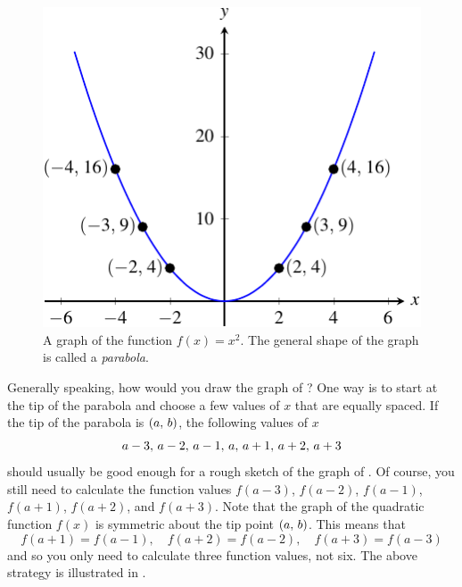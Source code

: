 \documentclass[a4paper,oneside,12pt]{article}
\begin{document}
\begin{figure}[!htbp]
\centering
\includegraphics[scale=1.2]{image/07/a-1.pdf}
\caption{%
  A graph of the function $f(x) = x^2$.  The general shape of the
  graph is called a \emph{parabola}.
}
\label{fig:quadratic_a_1}
\end{figure}

Generally speaking, how would you draw the graph of
?  One way is to start at the
tip of the parabola and choose a few values of $x$ that are equally
spaced.  If the tip of the parabola is $\left\lparen{a},\, {b}\right\rparen$, the following
values of $x$
\[
{a-3},\, {a-2},\, {a-1},\, {a},\, {a+1},\, {a+2},\, {a+3}
\]
should usually be good enough for a rough sketch of the graph of
.  Of course, you still need
to calculate the function values $f(a-3)$, $f(a-2)$, $f(a-1)$,
$f(a+1)$, $f(a+2)$, and $f(a+3)$.  Note that the graph of the
quadratic function $f(x)$ is symmetric about the tip point
$\left\lparen{a},\, {b}\right\rparen$.  This means that
\[
f(a+1) = f(a-1),
\quad
f(a+2) = f(a-2),
\quad
f(a+3) = f(a-3)
\]
and so you only need to calculate three function values, not six.
The above strategy is illustrated
in .
\end{document}

